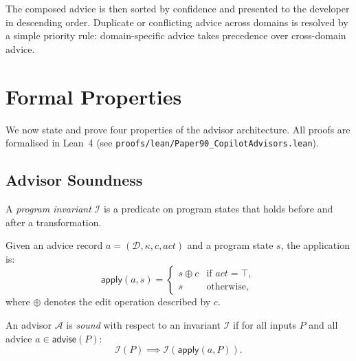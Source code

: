 \documentclass[11pt]{article}
\newcommand{\Adv}{\mathcal{A}}
\newcommand{\Domain}{\mathcal{D}}
\newcommand{\Conf}{\kappa}
\newcommand{\Inv}{\mathcal{I}}
\newcommand{\AdvisorOp}{\mathsf{advise}}
\begin{document}
The composed advice is then sorted by confidence and presented to
the developer in descending order.  Duplicate or conflicting advice
across domains is resolved by a simple priority rule: domain-specific
advice takes precedence over cross-domain advice.

\section{Formal Properties}\label{sec:formal}

We now state and prove four properties of the advisor architecture.
All proofs are formalised in Lean~4 (see
\texttt{proofs/lean/Paper90\_CopilotAdvisors.lean}).

\subsection{Advisor Soundness}\label{sec:soundness}

\begin{definition}\label{def:invariant}
A \emph{program invariant} $\Inv$ is a predicate on program states
that holds before and after a transformation.
\end{definition}

\begin{definition}\label{def:apply}
Given an advice record $a = (\Domain, \Conf, c, \mathit{act})$ and
a program state $s$, the application is:
\[
  \mathsf{apply}(a, s) = \begin{cases}
    s \oplus c & \text{if } \mathit{act} = \top, \\
    s          & \text{otherwise,}
  \end{cases}
\]
where $\oplus$ denotes the edit operation described by $c$.
\end{definition}

\begin{definition}\label{def:soundness}
An advisor $\Adv$ is \emph{sound} with respect to an invariant $\Inv$
if for all inputs $P$ and all advice $a \in \AdvisorOp(P)$:
\[
  \Inv(P) \implies \Inv(\mathsf{apply}(a, P)).
\]
\end{definition}
\end{document}
